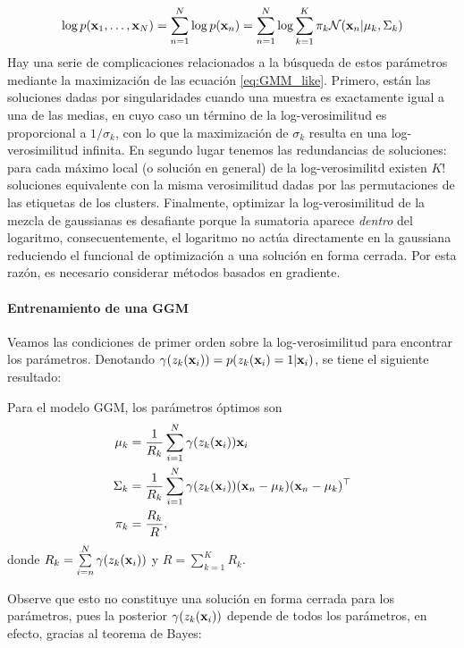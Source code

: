 \begin{equation}
	\log p(\mathbf{x}_1,\ldots,\mathbf{x}_N) = \sum_{n=1}^N \log p(\mathbf{x}_n) = \sum_{n=1}^N \log \sum_{k=1}^K  \pi_k{\mathcal N}(\mathbf{x}_n|\mu_k,\Sigma_k) \label{eq:GMM_like}	
\end{equation}
Hay una serie de complicaciones relacionados a la búsqueda de estos parámetros mediante la maximización de las ecuación \eqref{eq:GMM_like}. Primero, están las soluciones dadas por singularidades cuando una muestra es exactamente igual a una de las medias, en cuyo caso un término de la log-verosimilitud es proporcional a $1/\sigma_k$, con lo que la maximización de $\sigma_k$ resulta en una log-verosimilitud infinita. En segundo lugar tenemos las redundancias de soluciones: para cada máximo local (o solución en general) de la log-verosimilitd existen $K!$ soluciones equivalente con la misma verosimilitud dadas por las permutaciones de las etiquetas de los clusters. Finalmente, optimizar la log-verosimilitud de la mezcla de gaussianas es desafiante porque la sumatoria aparece \emph{dentro} del logaritmo, consecuentemente,  el logaritmo no actúa directamente en la gaussiana reduciendo el funcional de optimización a una solución en forma cerrada. Por esta razón, es necesario considerar métodos basados en gradiente.


\paragraph{Entrenamiento de una GGM}

Veamos las condiciones de primer orden sobre la log-verosimilitud para encontrar los parámetros. Denotando $\gamma(z_k(\mathbf{x}_i)) = p(z_k(\mathbf{x}_i)=1|\mathbf{x}_i)$, se tiene el siguiente resultado:

\begin{lemma} Para el modelo GGM, los parámetros óptimos son
	\begin{align}
    \mu_k & = \frac{1}{R_k}\sum_{i=1}^N \gamma(z_k(\mathbf{x}_i))\mathbf{x}_i\\
    \Sigma_k & = \frac{1}{R_k} \sum_{i=1}^N \gamma(z_k(\mathbf{x}_i))(\mathbf{x}_n - \mu_k)(\mathbf{x}_n - \mu_k)^\top\\
    \pi_k & = \frac{R_k}{R},
    \end{align}
    donde $R_k = \sum\limits_{i=n}^N \gamma(z_k(\mathbf{x}_i))$ y $R = \sum\limits_{k=1}^K R_k$.
\end{lemma}

Observe que esto no constituye una solución en forma cerrada para los parámetros, pues la posterior $\gamma(z_k(\mathbf{x}_i))$ depende de todos los parámetros, en efecto, gracias al teorema de Bayes:

